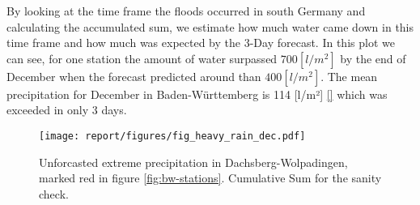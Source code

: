 \documentclass{article}
\theoremstyle{plain}
\theoremstyle{definition}
\theoremstyle{remark}
\begin{document}
By looking at the time frame the floods occurred in south Germany and calculating the accumulated sum, we estimate how much water came down in this time frame and how much was expected by the 3-Day forecast. In this plot we can see, for one station the amount of water surpassed $700 [l/m^2]$ by the end of December when the forecast predicted around than $400 [l/m^2]$. The mean precipitation for December in Baden-Württemberg is 114 [l/m²] \ref{} which was exceeded in only 3 days.

\begin{figure}[h]
\centering
\label{fig:cum_sum_heavy_rain}
\texttt{[image: report/figures/fig\_heavy\_rain\_dec.pdf]}
\caption{Unforcasted extreme precipitation in Dachsberg-Wolpadingen, marked red in figure \ref{fig:bw-stations}. Cumulative Sum for the sanity check. }
\end{figure}
\end{document}
